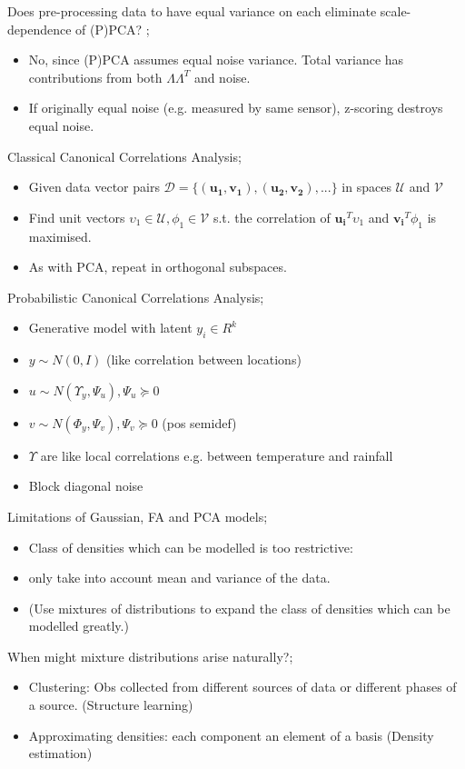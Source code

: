 \documentclass{article}
\begin{document}
Does pre-processing data to have equal variance on each eliminate scale-dependence of (P)PCA? ;\begin{itemize}
	\item No, since (P)PCA assumes equal noise variance. Total variance has contributions from both $\Lambda\Lambda^T$ and noise. 
	\item If originally equal noise (e.g. measured by same sensor), z-scoring destroys equal noise.
\end{itemize}

Classical Canonical Correlations Analysis; \begin{itemize}
	\item Given data vector pairs $\mathcal{D}=\{(\mathbf{u_1, v_1}), \mathbf{(u_2, v_2)},...\}$ in spaces $\mathcal{U}$ and $\mathcal{V}$
	\item Find unit vectors $\upsilon_1\in\mathcal{U}, \phi_1\in\mathcal{V}$ s.t. the correlation of $\mathbf{u_i}^T\upsilon_1$ and $\mathbf{v_i}^T\phi_1$ is maximised.
	\item As with PCA, repeat in orthogonal subspaces.
\end{itemize}

Probabilistic Canonical Correlations Analysis; \begin{itemize}
	\item Generative model with latent $y_i\in R^k$
	\item $y\sim N(0,I)$ (like correlation between locations)
	\item $u\sim N(\Upsilon_y, \Psi_u), \Psi_u \succeq 0$
	\item $v\sim N(\Phi_y, \Psi_v), \Psi_v \succeq 0$ (pos semidef)
	\item $\Upsilon$ are like local correlations e.g. between temperature and rainfall 
	\item Block diagonal noise
\end{itemize}

Limitations of Gaussian, FA and PCA models; \begin{itemize}
	\item Class of densities which can be modelled is too restrictive:
	\item only take into account mean and variance of the data.
	\item (Use mixtures of distributions to expand the class of densities which can be modelled greatly.)
\end{itemize}

When might mixture distributions arise naturally?; \begin{itemize}
	\item Clustering: Obs collected from different sources of data or different phases of a source. (Structure learning)
	\item Approximating densities: each component an element of a basis (Density estimation)
\end{itemize}
\end{document}
